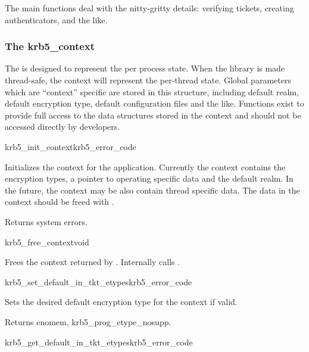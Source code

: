 The main functions deal with the nitty-gritty details: verifying
tickets, creating authenticators, and the like.

\subsubsection{The krb5_context}
The  is designed to represent the per process
state. When the library is made thread-safe, the context will represent
the per-thread state. Global parameters which are ``context'' specific
are stored in this structure, including default realm, default
encryption type, default configuration files and the like. Functions
exist to provide full access to the data structures stored in the
context and should not be accessed directly by developers.

\begin{funcdecl}{krb5_init_context}{krb5_error_code}{\funcinout}
\end{funcdecl}

Initializes the context  for the
application. Currently the context contains the encryption types, a
pointer to operating specific data and the default realm. In the future,
the context may be also contain thread specific data.  The data in the
context should be freed with .

Returns system errors.

\begin{funcdecl}{krb5_free_context}{void}{\funcinout}
\end{funcdecl}

Frees the context returned by . Internally
calls .

\begin{funcdecl}{krb5_set_default_in_tkt_etypes}{krb5_error_code}{\funcinout}
\funcin
{}
\end{funcdecl}

Sets the desired default encryption type  for the context
if valid.

Returns {\sc enomem}, {\sc krb5_prog_etype_nosupp}.

\begin{funcdecl}{krb5_get_default_in_tkt_etypes}{krb5_error_code}{\funcinout}
\funcout
{}
\end{funcdecl}

